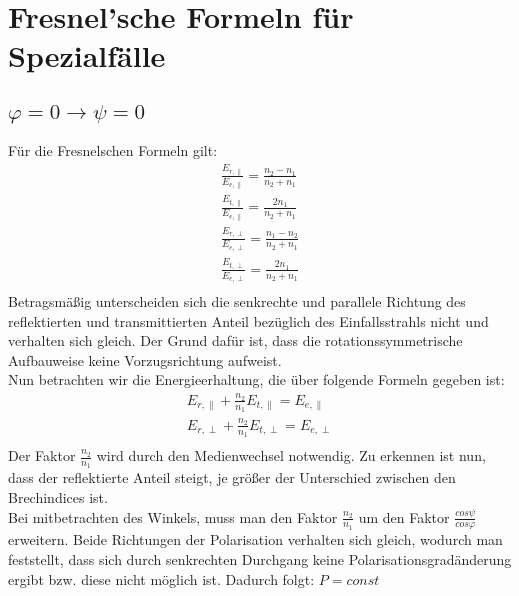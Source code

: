 \section{Fresnel'sche Formeln für  Spezialfälle }
\subsection*{$\varphi=0\rightarrow\psi=0$}
Für die Fresnelschen Formeln gilt:
\begin{align*}
\frac{E_{r,\parallel}}{E_{e,\parallel}}=\frac{n_2-n_1}{n_2+n_1}\\
\frac{E_{t,\parallel}}{E_{e,\parallel}}=\frac{2n_1}{n_2+n_1}\\
\frac{E_{r,\perp}}{E_{e,\perp}}=\frac{n_1-n_2}{n_2+n_1}\\
\frac{E_{t,\perp}}{E_{e,\perp}}=\frac{2n_1}{n_2+n_1}\\
\end{align*}
Betragsmäßig unterscheiden sich die senkrechte und parallele Richtung des reflektierten und transmittierten Anteil bezüglich des Einfallsstrahls nicht und verhalten sich gleich. Der Grund dafür ist, dass die rotationssymmetrische Aufbauweise keine Vorzugsrichtung aufweist. \\
Nun betrachten wir die Energieerhaltung, die über folgende Formeln gegeben ist:
\begin{align*}
E_{r,\parallel}+\frac{n_2}{n_1}E_{t,\parallel}=E_{e,\parallel}\\
E_{r,\perp}+\frac{n_2}{n_1}E_{t,\perp}=E_{e,\perp}\\
\end{align*}
Der Faktor $\frac{n_2}{n_1}$ wird durch den Medienwechsel notwendig. Zu erkennen ist nun, dass der reflektierte Anteil steigt, je größer der Unterschied zwischen den Brechindices ist. \\
Bei mitbetrachten des Winkels, muss man den Faktor $\frac{n_2}{n_1}$  um den Faktor $\frac{cos\psi}{cos\varphi}$ erweitern. 
Beide Richtungen der Polarisation verhalten sich gleich, wodurch man feststellt, dass sich durch senkrechten Durchgang keine Polarisationsgradänderung ergibt bzw. diese nicht möglich ist. Dadurch folgt: $P=const$

